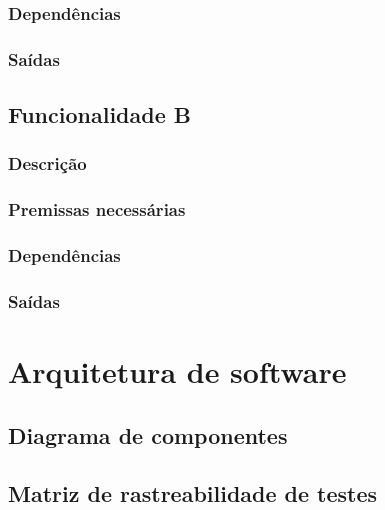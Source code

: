 \subsubsection{Dependências}
\label{ssub:depA}

\subsubsection{Saídas}
\label{ssub:saidaA}



\subsection{Funcionalidade B}
\label{sub:funcB}

\subsubsection{Descrição} %
\label{ssub:descB}

\subsubsection{Premissas necessárias}
\label{ssub:premB}

\subsubsection{Dependências}
\label{ssub:depB}

\subsubsection{Saídas}
\label{ssub:saidaB}


\section{Arquitetura de software}
\label{sec:arqs}


\subsection{Diagrama de componentes}
\label{sub:diagcomp}


\subsection{Matriz de rastreabilidade de testes}
\label{sub:matrast}


